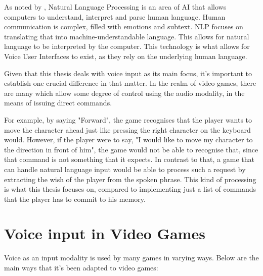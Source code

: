 As noted by \textcite{holdsworthWhatNLPNatural2024}, Natural Language Processing is an area of AI that allows computers to understand, interpret and parse human language.
Human communication is complex, filled with emotions and subtext. NLP focuses on translating that into machine-understandable language. 
This allows for natural language to be interpreted by the computer. This technology is what allows for Voice User Interfaces to exist, as they rely on the underlying human language.

Given that this thesis deals with voice input as its main focus, it's important to establish one crucial difference in that matter. In the realm of video games, there are many which allow some degree of control using the audio modality, 
in the means of issuing direct commands.

For example, by saying "Forward", the game recognises that the player wants to 
move the character ahead just like pressing the right character on the keyboard would.
However, if the player were to say, "I would like to move my character to the direction in front of him", the game would not be able to recognise that, since that command is not something that it expects. 
In contrast to that, a game that can handle natural language input would be able to process such a request by extracting the 
wish of the player from the spoken phrase.
This kind of processing is what this thesis focuses on, compared to implementing just a list of commands that the player has to commit to his memory. 

\section{Voice input in Video Games}

Voice as an input modality is used by many games in varying ways. 
Below are the main ways that it's been adapted to video games:


